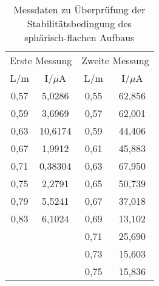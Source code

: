 \begin{table}[h!]
  \centering
  \caption{Messdaten zu Überprüfung der Stabilitätsbedingung des sphärisch-flachen Aufbaus}
  \label{tab:stabflat}
  \begin{tabular}{c c c c}
    \toprule
    \multicolumn{2}{c}{Erste Messung} & \multicolumn{2}{c}{Zweite Messung}\\
      L/m & I/$\mu$A & L/m & I/$\mu$A \\
      \midrule
      0,57 & 5,0286  & 0,55 & 62,856 \\
      0,59 & 3,6969  & 0,57 & 62,001 \\
      0,63 & 10,6174 & 0,59 & 44,406 \\
      0,67 & 1,9912  & 0,61 & 45,883 \\
      0,71 & 0,38304 & 0,63 & 67,950 \\
      0,75 & 2,2791  & 0,65 & 50,739 \\
      0,79 & 5,5241  & 0,67 & 37,018 \\
      0,83 & 6,1024  & 0,69 & 13,102 \\
          &          & 0,71 & 25,690 \\
          &          & 0,73 & 15,603 \\
          &          & 0,75 & 15,836 \\
    \bottomrule
  \end{tabular}
\end{table}

%
